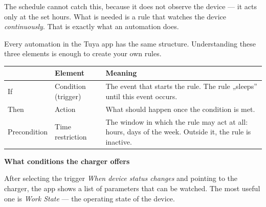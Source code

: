 \documentclass[11pt]{article}
\begin{document}
The schedule cannot catch this, because it does not observe the device — it acts only at the set hours. What is needed is a rule that watches the device \emph{continuously}. That is exactly what an automation does.

\clearpage


Every automation in the Tuya app has the same structure. Understanding these three elements is enough to create your own rules.

\vspace{0.3cm}
\begin{tabularx}{\textwidth}{@{}p{2.7cm}p{3.9cm}X@{}}
\toprule
& \textbf{\color{apnavy}Element} & \textbf{\color{apnavy}Meaning}\\
\midrule
If & Condition (trigger) & The event that starts the rule. The rule „sleeps” until this event occurs.\\
Then & Action & What should happen once the condition is met.\\
Precondition & Time restriction & The window in which the rule may act at all: hours, days of the week. Outside it, the rule is inactive.\\
\bottomrule
\end{tabularx}


\vspace{0.35cm}
{\bfseries\color{apnavy}\large What conditions the charger offers}

After selecting the trigger \emph{When device status changes} and pointing to the charger, the app shows a list of parameters that can be watched. The most useful one is \emph{Work State} — the operating state of the device.
\end{document}
